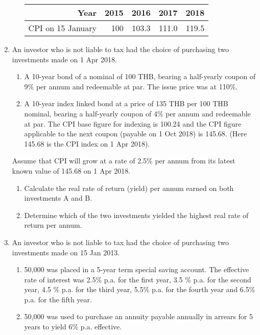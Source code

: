 \documentclass[
]{article}
\theoremstyle{definition}
\theoremstyle{definition}
\theoremstyle{definition}
\theoremstyle{definition}
\theoremstyle{remark}
\begin{document}
\begin{enumerate}
\begin{enumerate}
    \begin{longtable}[]{@{}rrrrr@{}}
    \toprule
    Year & 2015 & 2016 & 2017 & 2018 \\
    \midrule
    \endhead
    CPI on 15 January & 100 & 103.3 & 111.0 & 119.5 \\
    \bottomrule
    \end{longtable}
  \end{enumerate}
\item
  An investor who is not liable to tax had the choice of purchasing
  two investments made on 1 Apr 2018.

  \begin{enumerate}
  \def\labelenumii{(\Alph{enumii})}
  \item
    A 10-year bond of a nominal of 100 THB, bearing a half-yearly coupon of
    9\% per annum and redeemable at par. The issue price was at 110\%.
  \item
    A 10-year index linked bond at a price of 135 THB per 100 THB nominal, bearing a
    half-yearly coupon of 4\% per annum and redeemable at par. The
    CPI base figure for indexing is 100.24 and the CPI figure
    applicable to the next coupon (payable on 1 Oct 2018) is 145.68.
    (Here 145.68 is the CPI index on 1 Apr 2018).
  \end{enumerate}

  Assume that CPI will grow at a rate of 2.5\% per annum from its
  latest known value of 145.68 on 1 Apr 2018.

  \begin{enumerate}
  \def\labelenumii{\arabic{enumii}.}
  \item
    Calculate the real rate of return (yield) per annum earned on
    both investments A and B.
  \item
    Determine which of the two investments yielded the highest real
    rate of return per annum.
  \end{enumerate}
\item
  An investor who is not liable to tax had the choice of purchasing
  two investments made on 15 Jan 2013.

  \begin{enumerate}
  \def\labelenumii{(\Alph{enumii})}
  \item
    50,000 was placed in a 5-year term special saving account. The
    effective rate of interest was 2.5\% p.a. for the first year, 3.5
    \% p.a. for the second year, 4.5 \% p.a. for the third year, 5.5\%
    p.a. for the fourth year and 6.5\% p.a. for the fifth year.
  \item
    50,000 was used to purchase an annuity payable annually in arrears
    for 5 years to yield 6\% p.a. effective.
  \end{enumerate}


\end{enumerate}
\end{document}

